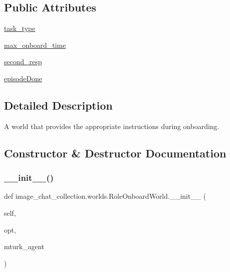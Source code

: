 \subsection*{Public Attributes}
\begin{DoxyCompactItemize}
\item 
\hyperlink{classimage__chat__collection_1_1worlds_1_1RoleOnboardWorld_ad9ed130b4de7849a205afa0d2e0881ab}{task\+\_\+type}
\item 
\hyperlink{classimage__chat__collection_1_1worlds_1_1RoleOnboardWorld_a01964521ee7db1f4fab890a88f0d1940}{max\+\_\+onboard\+\_\+time}
\item 
\hyperlink{classimage__chat__collection_1_1worlds_1_1RoleOnboardWorld_aae14ab21837d108894456e35c150f1fa}{second\+\_\+resp}
\item 
\hyperlink{classimage__chat__collection_1_1worlds_1_1RoleOnboardWorld_a5f75149b8c759e83c23b1e39ed2d5dbb}{episode\+Done}
\end{DoxyCompactItemize}


\subsection{Detailed Description}
\begin{DoxyVerb}A world that provides the appropriate instructions during onboarding.
\end{DoxyVerb}
 

\subsection{Constructor \& Destructor Documentation}
\mbox{\label{classimage__chat__collection_1_1worlds_1_1RoleOnboardWorld_abc1062c3b8465f56b06b8173925d117d}} 
\subsubsection{\texorpdfstring{\+\_\+\+\_\+init\+\_\+\+\_\+()}{\_\_init\_\_()}}
{\footnotesize\ttfamily def image\+\_\+chat\+\_\+collection.\+worlds.\+Role\+Onboard\+World.\+\_\+\+\_\+init\+\_\+\+\_\+ (\begin{DoxyParamCaption}\item[{}]{self,  }\item[{}]{opt,  }\item[{}]{mturk\+\_\+agent }\end{DoxyParamCaption})}



